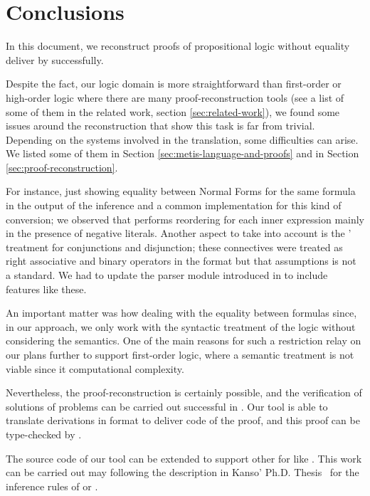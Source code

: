 \documentclass[../main.tex]{subfiles}
\begin{document}

\section{Conclusions}
\label{sec:conclusions}

In this document, we reconstruct proofs
of propositional logic without equality deliver by \Metis
successfully.

Despite the fact, our logic domain is more straightforward than
first-order or high-order logic where there are many
proof-reconstruction tools (see a list of some of them in the
related work, section \ref{sec:related-work}), we found some issues
around the reconstruction that show this task is far from trivial.
Depending  on the systems involved in the translation, some
difficulties can arise. We listed some of them in Section
\ref{sec:metis-language-and-proofs} and in Section
\ref{sec:proof-reconstruction}.

For instance, just showing equality between Normal Forms for the
same formula in the output of the \canonicalize inference and a
common implementation for this kind of conversion; we observed that
\Metis performs reordering for each inner expression mainly in the
presence of negative literals. Another aspect to take into account
is the \Metis' treatment for conjunctions and disjunction;
these connectives were treated as right associative and binary
operators in the \TSTP format but that assumptions is not a standard.
We had to update the \TSTP parser module introduced in
\cite{Gomez-Londono2015} to include features like these.

An important matter was how dealing with
the equality between formulas since, in our approach, we only work
with the syntactic treatment of the logic without considering the
semantics.
One of the main reasons for such a restriction relay on our plans
further to support first-order logic, where a semantic treatment is
not viable since it computational complexity.

Nevertheless, the proof-reconstruction is certainly possible, and
the verification of solutions of \CPL problems can be carried out
successful in \Agda. Our tool is able to translate \Metis
derivations in \TSTP format to deliver \Agda code of the proof,
and this proof can be type-checked by \Agda.

The source code of our tool can be extended to support
other \ATPs for \CPL like . This work can be carried out
may following the description in Kanso' Ph.D. Thesis~\cite{Kanso2012}
for the inference rules of  or .
\end{document}
